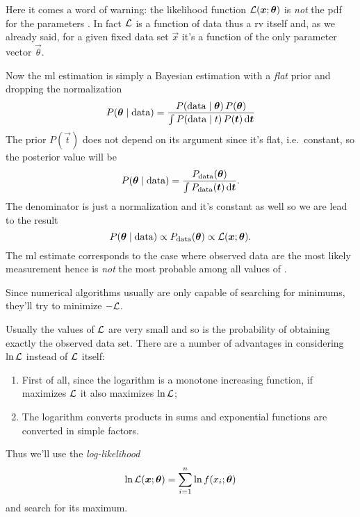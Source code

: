 Here it comes a word of warning: the likelihood function $\mathcal{L}(\bm{{x}};\bm{{\theta}})$ is \emph{not} the \ac{pdf} for the parameters \vec{\theta}.
In fact $\mathcal{L}$ is a function of data thus a \ac{rv} itself and, as we already said, for a given fixed data set $\vec{x}$ it's a function of the only parameter vector $\vec{\theta}$.



Now the \ac{ml} estimation is simply a Bayesian estimation with a \emph{flat} prior and dropping the normalization
\begin{equation}
	P(\bm{{\theta}}\mid\text{data}) = \frac{P(\textup{data}\mid\bm{{\theta}})\,P(\bm{{\theta}})}{\int P(\text{data}\mid t)\,P(\bm{{t}})\mathop{}\!\mathrm{d} \bm{{t}}}
\end{equation}
The prior $P(\vec{t})$ does not depend on its argument since it's flat, i.e.~constant, so the posterior value will be
\begin{equation}
	P(\bm{{\theta}}\mid\text{data})  = \frac{P_\textup{data}(\bm{{\theta}})}{\int P_\textup{data}(\bm{{t}})\mathop{}\!\mathrm{d} \bm{{t}}}.
\end{equation}
The denominator is just a normalization and it's constant as well so we are lead to the result
\begin{equation}
	P(\bm{{\theta}}\mid\text{data})\propto P_\textup{data}(\bm{{\theta}}) \propto \mathcal{L}(\bm{{x}};\bm{{\theta}}).
\end{equation}
The \ac{ml} estimate \vec{\hat\theta} corresponds to the case where observed data are the most likely measurement hence \vec{\hat\theta} is \emph{not} the most probable among all values of \vec{\theta}.


Since numerical algorithms usually are only capable of searching for minimums, they'll try to minimize $-\mathcal{L}$.


{\color{red}
	Usually the values of $\mathcal{L}$ are very small and so is the probability of obtaining exactly the observed data set.
}
There are a number of advantages in considering $\ln\mathcal{L}$ instead of $\mathcal{L}$ itself:
\begin{enumerate}
	\item
		First of all, since the logarithm is a monotone increasing function, if \vec{\hat\theta} maximizes $\mathcal{L}$ it also maximizes $\ln\mathcal{L}$;
	\item
		The logarithm converts products in sums and exponential functions are converted in simple factors.
\end{enumerate}
Thus we'll use the \emph{log-likelihood}
\begin{equation}
	\ln \mathcal{L}(\bm{{x}};\bm{{\theta}}) = \sum_{i=1}^n \ln f(x_i;\bm{{\theta}})
\end{equation}
and search for its maximum.

